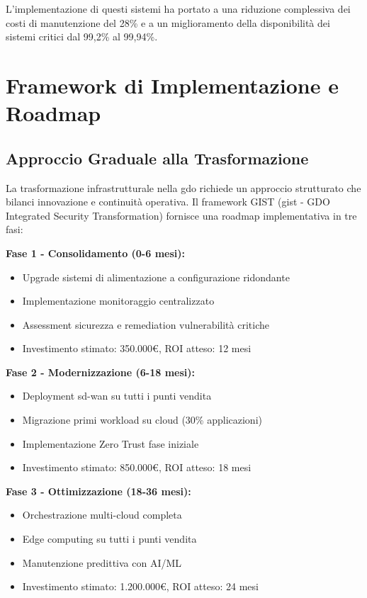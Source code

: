 L'implementazione di questi sistemi ha portato a una riduzione complessiva dei costi di manutenzione del 28\% e a un miglioramento della disponibilità dei sistemi critici dal 99,2\% al 99,94\%\autocite{MIT2024}.

\section{\texorpdfstring{Framework di Implementazione e Roadmap}{3.9 - Framework di Implementazione e Roadmap}}
\label{sec:implementation_framework}

\subsection{\texorpdfstring{Approccio Graduale alla Trasformazione}{3.9.1 - Approccio Graduale alla Trasformazione}}
\label{subsec:transformation_approach}

La trasformazione infrastrutturale nella \gls{gdo} richiede un approccio strutturato che bilanci innovazione e continuità operativa. Il framework GIST (\gls{gist} - GDO Integrated Security Transformation) fornisce una roadmap implementativa in tre fasi\autocite{Accenture2024}:

\textbf{Fase 1 - Consolidamento (0-6 mesi):}
\begin{itemize}
    \item Upgrade sistemi di alimentazione a configurazione ridondante
    \item Implementazione monitoraggio centralizzato
    \item Assessment sicurezza e remediation vulnerabilità critiche
    \item Investimento stimato: 350.000€, ROI atteso: 12 mesi
\end{itemize}

\textbf{Fase 2 - Modernizzazione (6-18 mesi):}
\begin{itemize}
    \item Deployment \gls{sd-wan} su tutti i punti vendita
    \item Migrazione primi workload su cloud (30\% applicazioni)
    \item Implementazione Zero Trust fase iniziale
    \item Investimento stimato: 850.000€, ROI atteso: 18 mesi
\end{itemize}

\textbf{Fase 3 - Ottimizzazione (18-36 mesi):}
\begin{itemize}
    \item Orchestrazione multi-cloud completa
    \item Edge computing su tutti i punti vendita
    \item Manutenzione predittiva con AI/ML
    \item Investimento stimato: 1.200.000€, ROI atteso: 24 mesi
\end{itemize}

